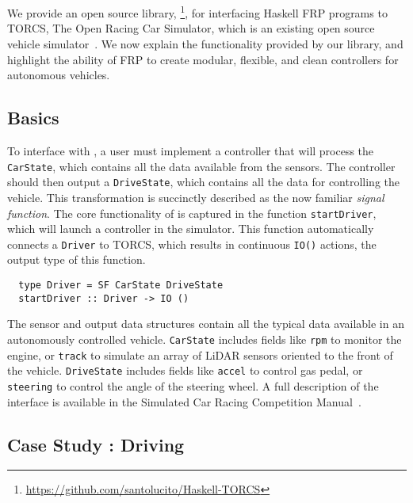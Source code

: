 \section{\ourLib}
We provide an open source library, \ourLib\footnote{\url{https://github.com/santolucito/Haskell-TORCS}}, for interfacing Haskell FRP programs to TORCS, The Open Racing Car Simulator, which is an existing open source vehicle simulator~\cite{torcs}.
We now explain the functionality provided by our library, and highlight the ability of FRP to create modular, flexible, and clean controllers for autonomous vehicles.

\subsection{Basics}

To interface with \ourLib, a user must implement a controller that will process the \texttt{CarState}, which contains all the data available from the sensors.
The controller should then output a \texttt{DriveState}, which contains all the data for controlling the vehicle.
This transformation is succinctly described as the now familiar \textit{signal function}.
The core functionality of \ourLib is captured in the function \texttt{startDriver}, which will launch a controller in the simulator.
This function automatically connects a \texttt{Driver} to TORCS, which results in continuous \texttt{IO()} actions, the output type of this function.

\vspace{0.2em}
\begin{lstlisting}
  type Driver = SF CarState DriveState
  startDriver :: Driver -> IO ()
\end{lstlisting}
\vspace{0.2em}

\noindent The sensor and output data structures contain all the typical data available in an autonomously controlled vehicle.
\texttt{CarState} includes fields like \texttt{rpm} to monitor the engine, or \texttt{track} to simulate an array of LiDAR sensors oriented to the front of the vehicle.
\texttt{DriveState} includes fields like \texttt{accel} to control gas pedal, or \texttt{steering} to control the angle of the steering wheel.
A full description of the interface is available in the Simulated Car Racing Competition Manual~\cite{SCRCManual}. 

\subsection{Case Study : Driving}

